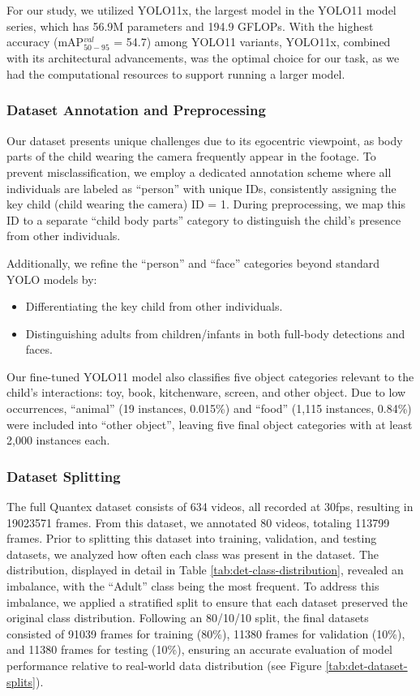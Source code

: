 \documentclass[
  man,floatsintext]{apa6}
\providecommand{\tightlist}{%
  \setlength{\itemsep}{0pt}\setlength{\parskip}{0pt}}
\begin{document}
For our study, we utilized YOLO11x, the largest model in the YOLO11 model series, which has 56.9M parameters and 194.9 GFLOPs. With the highest accuracy (mAP\(^{val}_{50-95}\) = 54.7) among YOLO11 variants, YOLO11x, combined with its architectural advancements, was the optimal choice for our task, as we had the computational resources to support running a larger model.

\subsubsection{Dataset Annotation and Preprocessing}\label{dataset-annotation-and-preprocessing-1}

Our dataset presents unique challenges due to its egocentric viewpoint, as body parts of the child wearing the camera frequently appear in the footage. To prevent misclassification, we employ a dedicated annotation scheme where all individuals are labeled as ``person'' with unique IDs, consistently assigning the key child (child wearing the camera) ID = 1. During preprocessing, we map this ID to a separate ``child body parts'' category to distinguish the child's presence from other individuals.

Additionally, we refine the ``person'' and ``face'' categories beyond standard YOLO models by:

\begin{itemize}
\tightlist
\item
  Differentiating the key child from other individuals.
\item
  Distinguishing adults from children/infants in both full-body detections and faces.
\end{itemize}

Our fine-tuned YOLO11 model also classifies five object categories relevant to the child's interactions: toy, book, kitchenware, screen, and other object. Due to low occurrences, ``animal'' (19 instances, 0.015\%) and ``food'' (1,115 instances, 0.84\%) were included into ``other object'', leaving five final object categories with at least 2,000 instances each.

\subsubsection{Dataset Splitting}\label{dataset-splitting}

The full Quantex dataset consists of 634 videos, all recorded at 30fps, resulting in 19023571 frames. From this dataset, we annotated 80 videos, totaling 113799 frames. Prior to splitting this dataset into training, validation, and testing datasets, we analyzed how often each class was present in the dataset. The distribution, displayed in detail in Table \ref{tab:det-class-distribution}, revealed an imbalance, with the ``Adult'' class being the most frequent. To address this imbalance, we applied a stratified split to ensure that each dataset preserved the original class distribution. Following an 80/10/10 split, the final datasets consisted of 91039 frames for training (80\%), 11380 frames for validation (10\%), and 11380 frames for testing (10\%), ensuring an accurate evaluation of model performance relative to real-world data distribution (see Figure \ref{tab:det-dataset-splits}).
\end{document}
